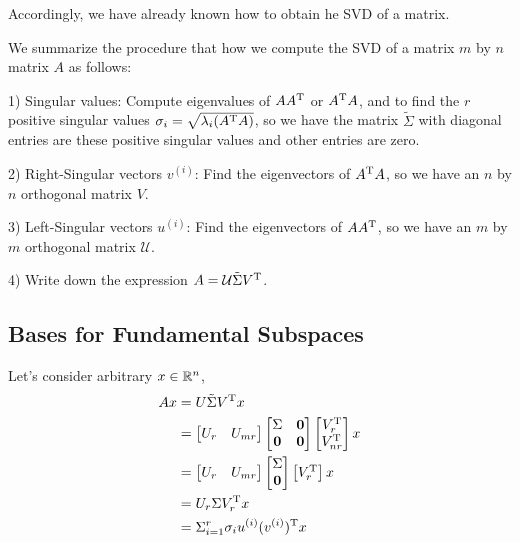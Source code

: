 Accordingly, we have already known how to obtain he SVD  of a matrix.

\vspace{0.3cm}
We summarize the procedure that how we compute the SVD of a matrix $m$ by $n$ matrix $A$ as follows:

1) Singular values: Compute eigenvalues of $AA^{{\rm T}}$ or $A^{{\rm T}}A$, and to find the $r$ positive singular values $\sigma_i = \sqrt{\lambda_i(A^{{\rm T}}A)}$, so we have the matrix $\tilde{\Sigma}$ with diagonal entries are these positive singular values and other entries are zero.


2) Right-Singular vectors $v^{(i)}$: Find the eigenvectors of $A^{{\rm T}}A$, so we have an $n$ by $n$ orthogonal matrix $V$.

3) Left-Singular vectors $u^{(i)}$: Find the eigenvectors of $AA^{{\rm T}}$, so we have an $m$ by $m$ orthogonal matrix $\mathcal{U}$.

4) Write down the expression $A = \mathcal{U} \tilde{\Sigma} V^{{\rm T}}$.

\vspace{0.5cm}

\subsection{Bases for Fundamental Subspaces}
Let's consider arbitrary $x\in \mathbb{R}^n$, 
\begin{align*}
Ax 
&= U\tilde{\Sigma} V^{\trans}x\\
&= 
\begin{bmatrix}%
U_r & U_{mr}
\end{bmatrix}
\begin{bmatrix}%
\Sigma & \textbf{0}\\
\textbf{0}& \textbf{0}
\end{bmatrix}
\begin{bmatrix}%
V_r^{\trans}\\
V_{nr}^{\trans}
\end{bmatrix}x\\
&= 
\begin{bmatrix}%
U_r & U_{mr}
\end{bmatrix}
\begin{bmatrix}%
\Sigma\\
\textbf{0}
\end{bmatrix}
\begin{bmatrix}%
V_r^{\trans}
\end{bmatrix}x\\
&=
U_r \Sigma V_r^{\trans} x\\
&= \Sigma^r_{i=1}\sigma_iu^{(i)}(v^{(i)})^{\trans}x
\end{align*}
\\

